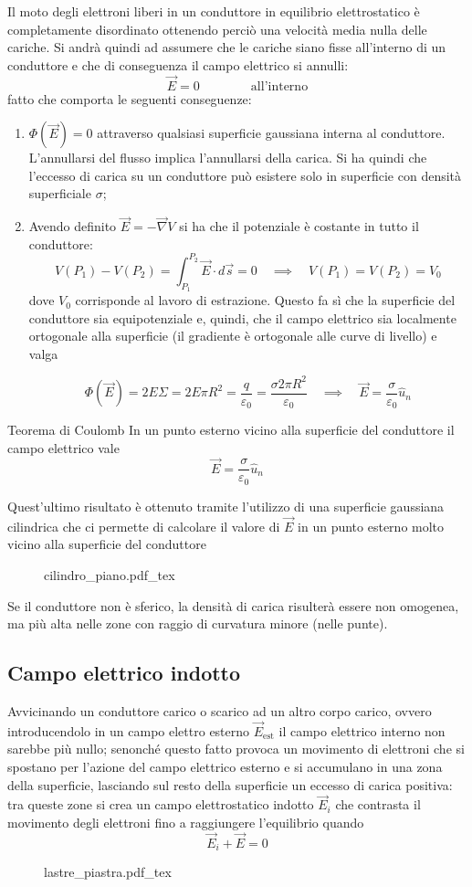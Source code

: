 \documentclass[x11names]{report}
\newcommand{\teorema}[2]{
	\begin{center}
		\fboxsep11pt
		\colorbox{myred}{\begin{minipage}{5.75in}
				\begin{redes}{#1}
					#2
				\end{redes}
		\end{minipage}}
	\end{center}
}
\newcommand{\incfig}[1]{%
	{#1.pdf_tex}
}
\begin{document}
Il moto degli elettroni liberi in un conduttore in equilibrio elettrostatico è completamente disordinato ottenendo perciò una velocità media nulla delle cariche. Si andrà quindi ad assumere che le cariche siano fisse all'interno di un conduttore e che di conseguenza il campo elettrico si annulli:
\[
\vec{E} = 0 \qquad\qquad \text{all'interno}
\]
fatto che comporta le seguenti conseguenze:
\begin{enumerate}
	\item \(\Phi(\vec{E}) = 0\) attraverso qualsiasi superficie gaussiana interna al conduttore. L'annullarsi del flusso implica l'annullarsi della carica. Si ha quindi che l'eccesso di carica su un conduttore può esistere solo in superficie con densità superficiale \(\sigma\);
	\item Avendo definito \(\vec{E} = - \vec{\nabla}V\) si ha che il potenziale è costante in tutto il conduttore:
	\[
	V(P_1) - V(P_2) = \int_{P_1}^{P_2}\vec{E} \cdot d\vec{s} = 0 \quad \implies \quad V(P_1) = V(P_2) = V_0
	\]
	dove \(V_0\) corrisponde al lavoro di estrazione.
	Questo fa sì che la superficie del conduttore sia equipotenziale e, quindi, che il campo elettrico sia localmente ortogonale alla superficie (il gradiente è ortogonale alle curve di livello) e valga
	
	\[
	\Phi(\vec{E}) = 2 E\Sigma = 2 E\pi R^2 = \frac{q}{\varepsilon_0} = \frac{\sigma 2\pi R^2}{\varepsilon_0} \quad \implies \quad \vec{E} = \frac{\sigma}{\varepsilon_0}\hat{u}_n
	\]
\end{enumerate}
\teorema{Teorema di Coulomb}{In un punto esterno vicino alla superficie del conduttore il campo elettrico vale
	\begin{equation}
		\vec{E} = \frac{\sigma}{\varepsilon_0} \hat{u}_n
\end{equation}}
Quest'ultimo risultato è ottenuto tramite l'utilizzo di una superficie gaussiana cilindrica che ci permette di calcolare il valore di \(\vec{E}\) in un punto esterno molto vicino alla superficie del conduttore
\begin{figure}[H]
	\centering
	\incfig{cilindro_piano}
\end{figure}
Se il conduttore non è sferico, la densità di carica risulterà essere non omogenea, ma più alta nelle zone con raggio di curvatura minore (nelle punte).

\subsection{Campo elettrico indotto}
Avvicinando un conduttore carico o scarico ad un altro corpo carico, ovvero introducendolo in un campo elettro esterno \(\vec{E}_\text{est}\) il campo elettrico interno non sarebbe più nullo; senonché questo fatto provoca un movimento di elettroni che si spostano per l'azione del campo elettrico esterno e si accumulano in una zona della superficie, lasciando sul resto della superficie un eccesso di carica positiva: tra queste zone si crea un campo elettrostatico indotto \(\vec{E}_i\) che contrasta il movimento degli elettroni fino a raggiungere l'equilibrio quando
\[
\vec{E}_i + \vec{E} = 0
	\]
\begin{figure}[H]
	\centering
	\incfig{lastre_piastra}
\end{figure}
\end{document}
